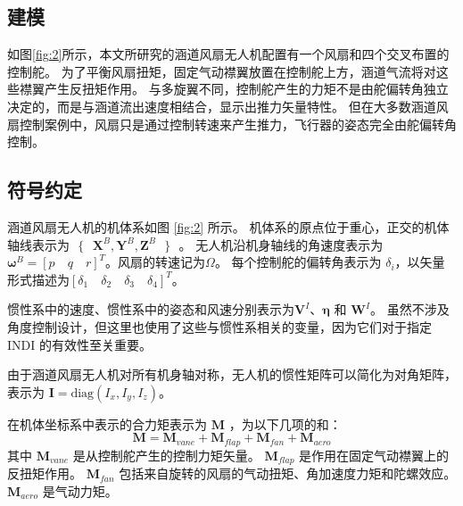 \begin{ubox}
\section{建模}
\label{sec:1}
如图\ref{fig:2}所示，本文所研究的涵道风扇无人机配置有一个风扇和四个交叉布置的控制舵。 为了平衡风扇扭矩，固定气动襟翼放置在控制舵上方，涵道气流将对这些襟翼产生反扭矩作用。 与多旋翼不同，控制舵产生的力矩不是由舵偏转角独立决定的，而是与涵道流出速度相结合，显示出推力矢量特性。 但在大多数涵道风扇控制案例中，风扇只是通过控制转速来产生推力，飞行器的姿态完全由舵偏转角控制。


\subsection{符号约定}
涵道风扇无人机的机体系如图 \ref{fig:2} 所示。 机体系的原点位于重心，正交的机体轴线表示为$\text{ }\!\!\{\!\!\text{ }{\bm{X}^{B}},{\bm{Y}^{B}},{\bm{Z}^{B}}\text{ }\!\!\}\!\!\text{ }$。 无人机沿机身轴线的角速度表示为${{\bm{\omega }}^{B}}=[p \quad q \quad r]^{T}$。风扇的转速记为$\Omega$。 每个控制舵的偏转角表示为 ${{\delta }_{i}}$，以矢量形式描述为$[{{\delta }_{1}} \quad {{\delta }_{2}} \quad {{\delta }_{3}} \quad {{\delta }_{4}}]^T$。



惯性系中的速度、惯性系中的姿态和风速分别表示为${{\bm{V}}^{I}}$、$\bm{\eta }$ 和 ${{\bm{W}}^{I}}$。 虽然不涉及角度控制设计，但这里也使用了这些与惯性系相关的变量，因为它们对于指定 INDI 的有效性至关重要。

由于涵道风扇无人机对所有机身轴对称，无人机的惯性矩阵可以简化为对角矩阵，表示为 $ \bm{I}=\text{diag}({{I}_{x} },{{I}_{y}},{{I}_{z}}) $。

在机体坐标系中表示的合力矩表示为 $\bm M$ ，为以下几项的和：
\begin{equation}
	{\bm{M}} = {{\bm{M}}_{vane}} + {{\bm{M}}_{flap}} + {{\bm{M}}_{fan}} + {{\bm{M}}_{aero}}
	\label{eq_1}
\end{equation}
其中 $ {{\bm{M}}_{vane}} $ 是从控制舵产生的控制力矩矢量。 $ {{\bm{M}}_{flap}} $ 是作用在固定气动襟翼上的反扭矩作用。 $ {{\bm{M}}_{fan}}$ 包括来自旋转的风扇的气动扭矩、角加速度力矩和陀螺效应。 $ {{\bm{M}}_{aero}} $ 是气动力矩。


\end{ubox}
